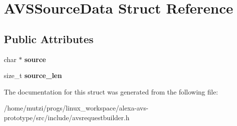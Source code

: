 \hypertarget{structAVSSourceData}{}\section{A\+V\+S\+Source\+Data Struct Reference}
\label{structAVSSourceData}
\subsection*{Public Attributes}
\begin{DoxyCompactItemize}
\item 
\mbox{\label{structAVSSourceData_a99a75c0fd0dad677cb401e8e091c83af}} 
char $\ast$ {\bfseries source}
\item 
\mbox{\label{structAVSSourceData_a8651e25d6ba50f942d4c0bd39fdb1db3}} 
size\+\_\+t {\bfseries source\+\_\+len}
\end{DoxyCompactItemize}


The documentation for this struct was generated from the following file\+:\begin{DoxyCompactItemize}
\item 
/home/mutzi/progs/linux\+\_\+workspace/alexa-\/avs-\/prototype/src/include/avsrequestbuilder.\+h\end{DoxyCompactItemize}
